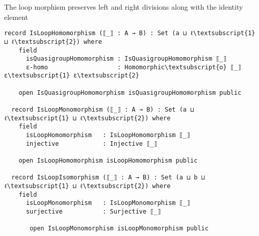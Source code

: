 The loop morphism preserves left and right divisions along with the identity element 

\begin{comment}
module LoopMorphisms (L\textsubscript{1} : RawLoop a ℓ\textsubscript{1}) (L\textsubscript{2} : RawLoop b ℓ\textsubscript{2}) where

  open RawLoop L\textsubscript{1} renaming (Carrier to A; ∙-rawMagma to ∙-rawMagma\textsubscript{1};
                            \textbackslash\textbackslash-rawMagma to \textbackslash\textbackslash-rawMagma\textsubscript{1}; //-rawMagma to //-rawMagma\textsubscript{1};
                             _≈_ to _≈\textsubscript{1}_; _∙_ to _∙\textsubscript{1}_; _\textbackslash\textbackslash_ to _\textbackslash\textbackslash\textsubscript{1}_; _//_ to _//\textsubscript{1}_; ε to ε\textsubscript{1})
  open RawLoop L\textsubscript{2} renaming (Carrier to B; ∙-rawMagma to ∙-rawMagma\textsubscript{2};
                            \textbackslash\textbackslash-rawMagma to \textbackslash\textbackslash-rawMagma\textsubscript{2}; //-rawMagma to //-rawMagma\textsubscript{2};
                            _≈_ to _≈\textsubscript{2}_; _∙_ to _∙\textsubscript{2}_; _\textbackslash\textbackslash_ to _\textbackslash\textbackslash\textsubscript{2}_; _//_ to _//\textsubscript{2}_ ; ε to ε\textsubscript{2})
  open MorphismDefinitions A B _≈\textsubscript{2}_
  open FunctionDefinitions _≈\textsubscript{1}_ _≈\textsubscript{2}_

  open QuasigroupMorphisms (RawLoop.rawQuasigroup L\textsubscript{1}) (RawLoop.rawQuasigroup L\textsubscript{2})
\end{comment}
\begin{Verbatim}[commandchars=\\\{\},samepage=true]
 record IsLoopHomomorphism (⟦_⟧ : A → B) : Set (a ⊔ ℓ\textsubscript{1} ⊔ ℓ\textsubscript{2}) where
    field
      isQuasigroupHomomorphism : IsQuasigroupHomomorphism ⟦_⟧
      ε-homo                   : Homomorphic\textsubscript{o} ⟦_⟧ ε\textsubscript{1} ε\textsubscript{2}

    open IsQuasigroupHomomorphism isQuasigroupHomomorphism public

  record IsLoopMonomorphism (⟦_⟧ : A → B) : Set (a ⊔ ℓ\textsubscript{1} ⊔ ℓ\textsubscript{2}) where
    field
      isLoopHomomorphism   : IsLoopHomomorphism ⟦_⟧
      injective            : Injective ⟦_⟧

    open IsLoopHomomorphism isLoopHomomorphism public

  record IsLoopIsomorphism (⟦_⟧ : A → B) : Set (a ⊔ b ⊔ ℓ\textsubscript{1} ⊔ ℓ\textsubscript{2}) where
    field
      isLoopMonomorphism   : IsLoopMonomorphism ⟦_⟧
      surjective           : Surjective ⟦_⟧

       open IsLoopMonomorphism isLoopMonomorphism public
\end{Verbatim}
